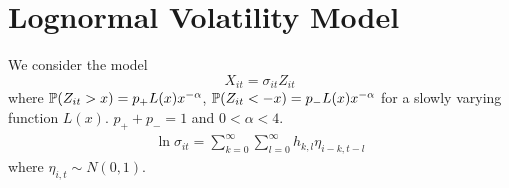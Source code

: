 \documentclass{article}
\begin{document}
\section{Lognormal Volatility Model}
We consider the model
\[
X_{it} = \sigma_{it} Z_{it}
\]
where $\mathbb{P}(Z_{it} > x) = p_+ L(x) x^{-\alpha}$, $\mathbb{P}(Z_{it} < -x) =
p_- L(x) x^{-\alpha}$ for a slowly varying function $L(x)$. $p_+ +
p_- = 1$ and $0 < \alpha < 4$.
\begin{eqnarray*}
  \ln \sigma_{it} = \sum_{k=0}^\infty \sum_{l=0}^\infty h_{k,l}
  \eta_{i-k,t-l}
\end{eqnarray*}
where $\eta_{i,t} \sim N(0, 1)$.



\end{document}

